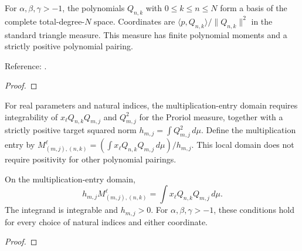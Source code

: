 \begin{theorem}
\label{thm:proriol-triangle-bases}
\leanok
For $\alpha,\beta,\gamma>-1$, the polynomials $Q_{n,k}$ with $0\le k\le n\le N$
form a basis of the complete total-degree-$N$ space. Coordinates are
$\langle p,Q_{n,k}\rangle/\|Q_{n,k}\|^2$ in the standard triangle measure.
This measure has finite polynomial moments and a strictly positive polynomial pairing.

Reference: \cite[Section 2.4]{dunkl-xu}.
\end{theorem}
\begin{proof}
\leanok
\end{proof}


\begin{supporting}
\begin{definition}
\label{def:proriol-multiplication-entry}
\leanok
For real parameters and natural indices, the multiplication-entry domain requires integrability of
$x_\ell Q_{n,k}Q_{m,j}$ and $Q_{m,j}^2$ for the Proriol measure, together with
a strictly positive target squared norm $h_{m,j}=\int Q_{m,j}^2\,d\mu$.
Define the multiplication entry by
$M^\ell_{(m,j),(n,k)}=(\int x_\ell Q_{n,k}Q_{m,j}\,d\mu)/h_{m,j}$.
This local domain does not require positivity for other polynomial pairings.
\end{definition}

\begin{theorem}
\label{thm:proriol-multiplication-entry}
\leanok
On the multiplication-entry domain,
\[
 h_{m,j}M^\ell_{(m,j),(n,k)}=\int x_\ell Q_{n,k}Q_{m,j}\,d\mu.
\]
The integrand is integrable and $h_{m,j}>0$. For
$\alpha,\beta,\gamma>-1$, these conditions hold for every choice of natural
indices and either coordinate.
\end{theorem}
\begin{proof}
\leanok
\end{proof}
\end{supporting}


